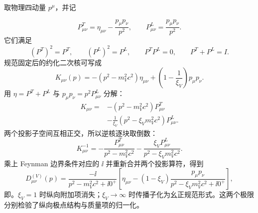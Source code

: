 \begin{derivation}
取物理四动量 $p^\mu$，并记

\begin{equation*}
 P^T_{\mu\nu}=\eta_{\mu\nu}-\frac{p_\mu p_\nu}{p^2},
 \qquad
 P^L_{\mu\nu}=\frac{p_\mu p_\nu}{p^2}.
\end{equation*}
它们满足
\begin{equation*}
 (P^T)^2=P^T,
 \qquad
 (P^L)^2=P^L,
 \qquad
 P^TP^L=0,
 \qquad
 P^T+P^L=I.
\end{equation*}
规范固定后的约化二次核可写成
\begin{equation*}
 K_{\mu\nu}(p)
 =-(p^2-m_V^2c^2)\eta_{\mu\nu}
 +\left(1-\frac1{\xi_V}\right)p_\mu p_\nu.
\end{equation*}
用 $\eta=P^T+P^L$ 与 $p_\mu p_\nu=p^2P^L_{\mu\nu}$ 分解：
\begin{align*}
 K_{\mu\nu}
 ={}&-(p^2-m_V^2c^2)P^T_{\mu\nu}\\
 &-\frac1{\xi_V}(p^2-\xi_Vm_V^2c^2)P^L_{\mu\nu}.
\end{align*}
两个投影子空间互相正交，所以逆核逐块取倒数：
\begin{equation*}
 K^{-1}_{\mu\nu}
 =-\frac{P^T_{\mu\nu}}{p^2-m_V^2c^2}
 -\frac{\xi_VP^L_{\mu\nu}}{p^2-\xi_Vm_V^2c^2}.
\end{equation*}
乘上 Feynman 边界条件对应的 $\ii$ 并重新合并两个投影算符，得到
\begin{equation*}
 D^{(V)}_{\mu\nu}(p)
 =\frac{-\ii}{p^2-m_V^2c^2+\ii0^+}
 \left[
 \eta_{\mu\nu}
 -(1-\xi_V)
 \frac{p_\mu p_\nu}{p^2-\xi_Vm_V^2c^2+\ii0^+}
 \right],
\end{equation*}
即。$\xi_V=1$ 时纵向附加项消失；$\xi_V\to\infty$ 时传播子化为幺正规范形式。这两个极限分别检验了纵向极点结构与质量项的归一化。
\end{derivation}
